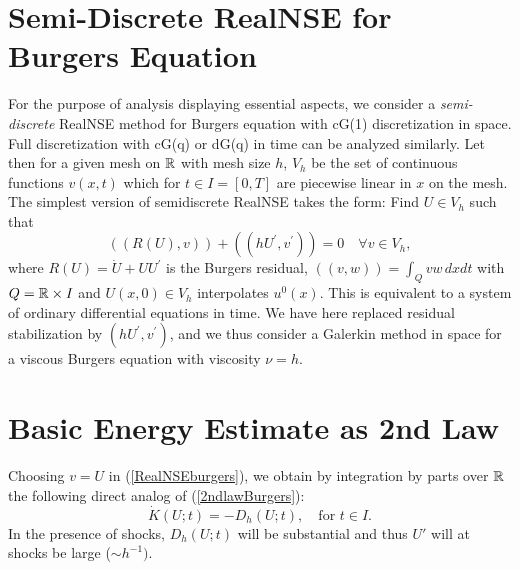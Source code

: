  
\section{Semi-Discrete RealNSE for Burgers Equation}

For the purpose of analysis displaying essential aspects,
we consider a \emph{semi-discrete} RealNSE method for Burgers equation with
cG(1) discretization in space. Full discretization
with cG(q) or dG(q) in time can be analyzed similarly.
Let then for a
given mesh on ${\mathbb{R}}$ with 
mesh size $h$, $V_h$ be the set of continuous functions $v(x,t)$ 
which for $t\in I=[0,T]$ are piecewise linear in $x$ on the mesh.
The simplest version of semidiscrete RealNSE takes the form: 
Find $U\in V_h$ such that
\begin{equation}\label{RealNSEburgers} 
  ((R(U),v))+((hU^\prime ,v^\prime ))=0\quad\forall v\in V_h,
\end{equation}
where $R(U)=\dot U+UU^\prime$ is the Burgers residual, $((v,w))=\int_Q vw\, dxdt$ with $Q={\mathbb{R}}\times I$ and $U(x,0)\in V_h$ 
interpolates $u^0(x)$. 
This is equivalent to a  system of ordinary differential equations
in time. We have here replaced residual stabilization by
$(hU^\prime ,v^\prime )$, and we thus consider 
a Galerkin method in space for a viscous Burgers equation
with viscosity $\nu =h$.    

\section{Basic Energy Estimate as 2nd Law}

Choosing $v=U$ in (\ref{RealNSEburgers}), we obtain by 
integration by parts over ${\mathbb{R}}$ the following direct analog
of (\ref{2ndlawBurgers}):
\[
\dot K(U;t)=-D_h(U;t),\quad\mbox{for } t\in I.
\]
%
In the presence of shocks, $D_h(U; t)$ will be substantial
and thus $U'$ will at shocks be large ($\sim h^{-1})$.



